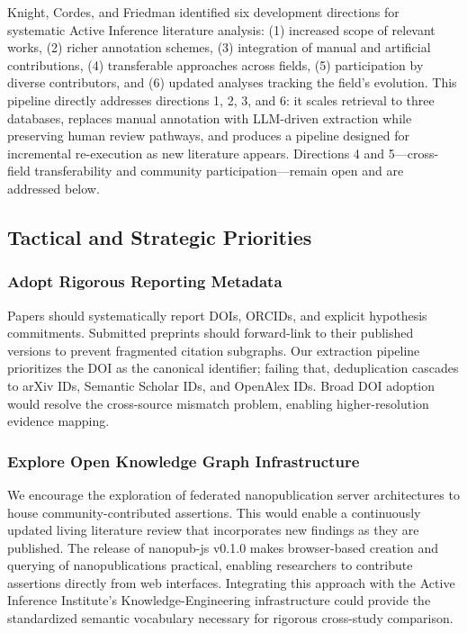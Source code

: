 \documentclass[
  english,
]{article}
\begin{document}
{{{{{{{{{{{{{{{{Knight, Cordes, and Friedman \citep{knight2022fep} identified six
development directions for systematic Active Inference literature
analysis: (1) increased scope of relevant works, (2) richer annotation
schemes, (3) integration of manual and artificial contributions, (4)
transferable approaches across fields, (5) participation by diverse
contributors, and (6) updated analyses tracking the field's evolution.
This pipeline directly addresses directions 1, 2, 3, and 6: it scales
retrieval to three databases, replaces manual annotation with LLM-driven
extraction while preserving human review pathways, and produces a
pipeline designed for incremental re-execution as new literature
appears. Directions 4 and 5---cross-field transferability and community
participation---remain open and are addressed below.

\subsection{Tactical and Strategic
Priorities}\label{tactical-and-strategic-priorities}

\subsubsection{Adopt Rigorous Reporting
Metadata}\label{adopt-rigorous-reporting-metadata}

Papers should systematically report DOIs, ORCIDs, and explicit
hypothesis commitments. Submitted preprints should forward-link to their
published versions to prevent fragmented citation subgraphs. Our
extraction pipeline prioritizes the DOI as the canonical identifier;
failing that, deduplication cascades to arXiv IDs, Semantic Scholar IDs,
and OpenAlex IDs. Broad DOI adoption would resolve the cross-source
mismatch problem, enabling higher-resolution evidence mapping.

\subsubsection{Explore Open Knowledge Graph
Infrastructure}\label{explore-open-knowledge-graph-infrastructure}

We encourage the exploration of federated nanopublication server
architectures to house community-contributed assertions. This would
enable a continuously updated living literature review that incorporates
new findings as they are published. The release of nanopub-js v0.1.0
\citep{kuhn2026nanopubjs} makes browser-based creation and querying of
nanopublications practical, enabling researchers to contribute
assertions directly from web interfaces. Integrating this approach with
the Active Inference Institute's Knowledge-Engineering infrastructure
\citep{knight2022fep} could provide the standardized semantic vocabulary
necessary for rigorous cross-study comparison.

}}}}}}}}}}}}}}}}
\end{document}
